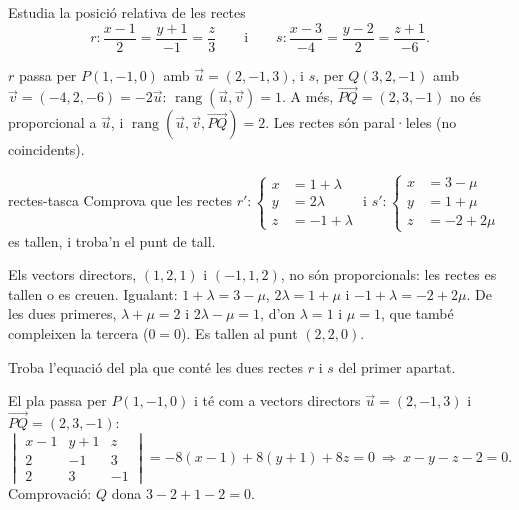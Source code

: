 \begin{apartats}

Estudia la posició relativa de les rectes
\[
r\colon\frac{x-1}{2}=\frac{y+1}{-1}=\frac{z}{3}\qquad\text{i}\qquad
s\colon\frac{x-3}{-4}=\frac{y-2}{2}=\frac{z+1}{-6}.
\]

\begin{solucio}
$r$ passa per $P(1,-1,0)$ amb $\vec u=(2,-1,3)$, i $s$, per $Q(3,2,-1)$ amb $\vec v=(-4,2,-6)=-2\vec u$:
$\operatorname{rang}(\vec u,\vec v)=1$. A més, $\overrightarrow{PQ}=(2,3,-1)$ no és proporcional a
$\vec u$, i $\operatorname{rang}(\vec u,\vec v,\overrightarrow{PQ})=2$. Les rectes són paral·leles (no
coincidents).
\end{solucio}

\begin{tria}{rectes-tasca}
Comprova que les rectes
$r'\colon\left\{\begin{aligned}x&=1+\lambda\\y&=2\lambda\\z&=-1+\lambda\end{aligned}\right.$ i
$s'\colon\left\{\begin{aligned}x&=3-\mu\\y&=1+\mu\\z&=-2+2\mu\end{aligned}\right.$ es tallen, i troba'n el
punt de tall.

\begin{solucio}
Els vectors directors, $(1,2,1)$ i $(-1,1,2)$, no són proporcionals: les rectes es tallen o es creuen.
Igualant: $1+\lambda=3-\mu$, $2\lambda=1+\mu$ i $-1+\lambda=-2+2\mu$. De les dues primeres,
$\lambda+\mu=2$ i $2\lambda-\mu=1$, d'on $\lambda=1$ i $\mu=1$, que també compleixen la tercera
($0=0$). Es tallen al punt $(2,2,0)$.
\end{solucio}

Troba l'equació del pla que conté les dues rectes $r$ i $s$ del primer apartat.

\begin{solucio}
El pla passa per $P(1,-1,0)$ i té com a vectors directors $\vec u=(2,-1,3)$ i
$\overrightarrow{PQ}=(2,3,-1)$:
\[
\begin{vmatrix}x-1&y+1&z\\2&-1&3\\2&3&-1\end{vmatrix}=-8(x-1)+8(y+1)+8z=0
\ \Longrightarrow\ x-y-z-2=0.
\]
Comprovació: $Q$ dona $3-2+1-2=0$.
\end{solucio}
\end{tria}


\end{apartats}
